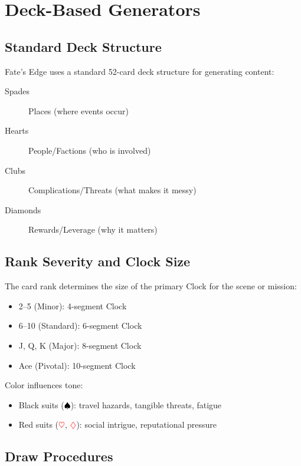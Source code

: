 \chapter{Deck-Based Generators}

\section{Standard Deck Structure}

Fate's Edge uses a standard 52-card deck structure for generating content:

\begin{description}
\item[Spades] Places (where events occur)
\item[Hearts] People/Factions (who is involved)
\item[Clubs] Complications/Threats (what makes it messy)
\item[Diamonds] Rewards/Leverage (why it matters)
\end{description}

\section{Rank Severity and Clock Size}

The card rank determines the size of the primary Clock for the scene or mission:

\begin{itemize}
\item 2--5 (Minor): 4-segment Clock
\item 6--10 (Standard): 6-segment Clock
\item J, Q, K (Major): 8-segment Clock
\item Ace (Pivotal): 10-segment Clock
\end{itemize}

Color influences tone:
\begin{itemize}
\item Black suits (\textcolor{black}{$\spadesuit$}): travel hazards, tangible threats, fatigue
\item Red suits (\textcolor{red}{$\heartsuit$}, \textcolor{red}{$\diamondsuit$}): social intrigue, reputational pressure
\end{itemize}

\section{Draw Procedures}

